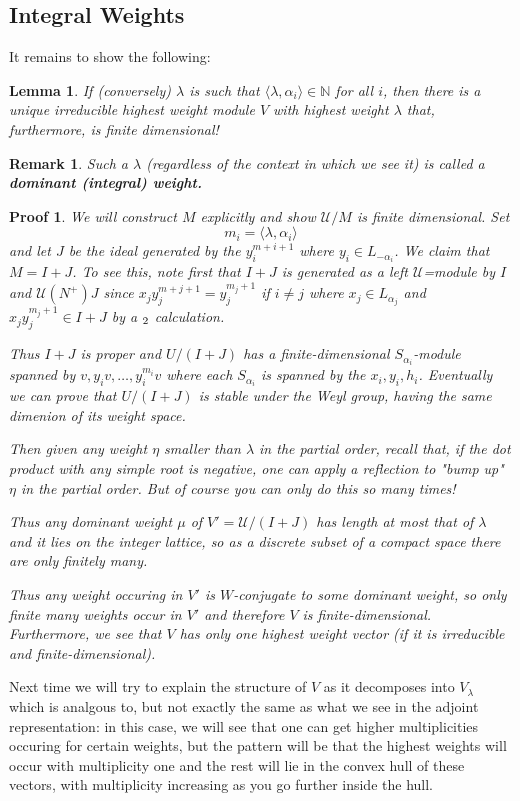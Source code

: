 \documentclass[12pt]{article}
\theoremstyle{nonumberbreak}
\theoremstyle{changebreak}
\newtheorem{lem}[thm]{Lemma}
\theoremstyle{nonumberbreak}
\newtheorem{prf}{Proof}
\theoremstyle{change}
\newtheorem{rmk}[thm]{Remark}
\newcommand*{\N}{
\mathbb{N}
}
\let\sl\relax
\DeclareMathOperator{\sl}{\mathfrak{sl}}
\begin{document}
\subsection{Integral Weights}
It remains to show the following:
\begin{lem}
	If (conversely) $\lambda$ is such that $\langle\lambda,\alpha_i\rangle\in\N$ for all $i$, 
	then there is a unique irreducible highest weight module $V$ with highest weight $\lambda$ 
	that, furthermore, is finite dimensional!
\end{lem}
\begin{rmk}
	Such a $\lambda$ (regardless of the context in which we see it) is called a \textbf{dominant (integral) weight.}
\end{rmk}
\begin{prf}
	We will construct $M$ explicitly and show $\mathcal U/M$ is finite dimensional. Set
	\[m_i=\langle\lambda,\alpha_i\rangle\]
	and let $J$ be the ideal generated by the $y_i^{m+i+1}$ where $y_i\in L_{-\alpha_i}$. We claim that $M=I+J$. To see this, note first that
	$I+J$ is generated as a left $\mathcal U$=module by $I$  and $\mathcal U(N^+)J$ since $x_jy_j^{m+j+1}=y_j^{m_j+1}$ if $i\ne j$ where $x_j\in L_{\alpha_j}$
	and $x_jy_j^{m_j+1}\in I+J$ by a $\sl_2$ calculation. 

	Thus $I+J$ is proper and $U/(I+J)$ has a finite-dimensional $S_{\alpha_i}$-module spanned by $v, y_iv,\dots, y_i^{m_i}v$
	where each $S_{\alpha_i}$ is spanned by the $x_i,y_i,h_i$. Eventually we can prove that $U/(I+J)$ is stable under 
	the Weyl group, having the same dimenion of its weight space.

	Then given any weight $\eta$ smaller than $\lambda$ in the partial order, recall that, if the dot product with any simple root 
	is negative, one can apply a reflection to "bump up" $\eta$ in the partial order. But of course you can only do this so many times!

	Thus any dominant weight $\mu$ of $V'=\mathcal U/(I+J)$ has length at most that of $\lambda$ and it lies on the integer lattice,
	so as a discrete subset of a compact space there are only finitely many.

	Thus any weight occuring in $V'$ is $W$-conjugate to some dominant weight, so only finite many weights occur in $V'$ 
	and therefore $V$ is finite-dimensional. Furthermore, we see that $V$ has only one highest weight vector (if it is irreducible and finite-dimensional). 
\end{prf}

Next time we will try to explain the structure of $V$ as it decomposes into $V_\lambda$ which is analgous to, but not
exactly the same as what we see in the adjoint representation: in this case, we will see that one can get higher multiplicities
occuring for certain weights, but the pattern will be that the highest weights will occur with multiplicity one and the rest 
will lie in the convex hull of these vectors, with multiplicity increasing as you go further inside the hull.
\end{document}
